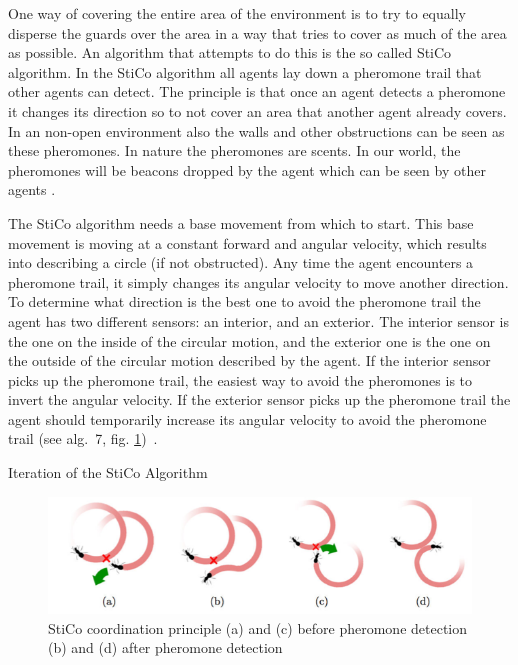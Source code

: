 
One way of covering the entire area of the environment is to try to equally disperse the guards over the area in a way that tries to cover as much of the area as possible. An algorithm that attempts to do this is the so called StiCo algorithm. In the StiCo algorithm all agents lay down a pheromone trail that other agents can detect. The principle is that once an agent detects a pheromone it changes its direction so to not cover an area that another agent already covers. In an non-open environment also the walls and other obstructions can be seen as these pheromones. In nature the pheromones are scents. In our world, the pheromones will be beacons dropped by the agent which can be seen by other agents \cite{ranjbar2012multi}.

The StiCo algorithm needs a base movement from which to start. This base movement is moving at a constant forward and angular velocity, which results into describing a circle (if not obstructed). Any time the agent encounters a pheromone trail, it simply changes its angular velocity to move another direction. To determine what direction is the best one to avoid the pheromone trail the agent has two different sensors: an interior, and an exterior. The interior sensor is the one on the inside of the circular motion, and the exterior one is the one on the outside of the circular motion described by the agent. If the interior sensor picks up the pheromone trail, the easiest way to avoid the pheromones is to invert the angular velocity. If the exterior sensor picks up the pheromone trail the agent should temporarily increase its angular velocity to avoid the pheromone trail (see alg.~7, fig. \ref{fig:movingDirections})~\cite{ranjbar2012multi}.

\begin{algorithm}
\label{alg:StiCo}
\caption{Iteration of the StiCo Algorithm~\protect\cite{ranjbar2012multi}}
\end{algorithm}

\begin{figure}
\centering
\includegraphics[width=\columnwidth]{images/stico.png}
\caption{StiCo coordination principle (a) and (c) before pheromone detection (b) and (d) after pheromone detection~\protect\cite{ranjbar2012multi}}
\label{fig:movingDirections}
\end{figure}

